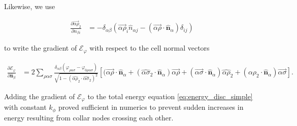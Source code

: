 \documentclass[draft]{article}
\newcommand{\e}{\mathcal{E}}
\newcommand{\bh}[1]{\hat{\bm{#1}}}
\begin{document}
Likewise, we use 

\begin{align*}
	\frac{\partial\vec{\alpha\rho}_2}{\partial n_{\beta i}} &= -\delta_{\alpha\beta} \left(\vec{\alpha\rho}_i \hat{n}_{\alpha j} - (\vec{\alpha\rho} \cdot \bh{n}_\alpha) \delta_{ij} \right)
\end{align*}

\noindent to write the gradient of $\e_\varphi$ with respect to the cell normal vectors

\begin{align*}
	\frac{\partial \e_\varphi}{\partial \bh{n}_\beta} &= 2 \sum_{\rho\alpha\sigma} \frac{\delta_{\alpha\beta}(\varphi_{\rho\alpha\sigma} - \varphi_{0\rho\alpha\sigma})}{\sqrt{1 - (\hat{\alpha\rho}_2 \cdot \hat{\alpha\sigma}_2)^2}} \left[(\vec{\alpha\rho} \cdot \bh{n}_\alpha + (\hat{\alpha\sigma}_2 \cdot \bh{n}_\alpha)\vec{\alpha\rho} + (\vec{\alpha\sigma} \cdot \bh{n}_\alpha) \hat{\alpha\rho}_2 + (\hat{\alpha\rho}_2 \cdot \bh{n}_\alpha) \vec{\alpha\sigma} \right].
\end{align*}

Adding the gradient of $\e_\varphi$ to the total energy equation \ref{eq:energy_disc_simple} with constant $k_\phi$ proved sufficient in numerics to prevent sudden increases in energy resulting from collar nodes crossing each other. 
\end{document}
